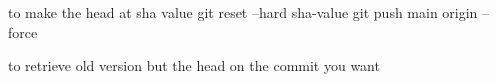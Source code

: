 to make the head at sha value 
git reset --hard sha-value
git push main origin --force 

to retrieve old version but the head on the commit you want 